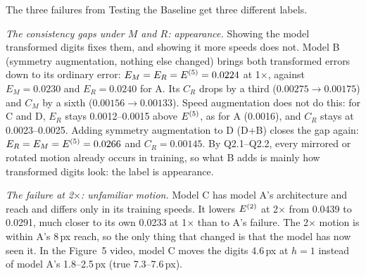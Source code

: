  The three failures from Testing the Baseline get three different labels.

\emph{The consistency gaps under $M$ and $R$: appearance.} Showing the model transformed digits fixes them,
and showing it more speeds does not. Model B (symmetry augmentation, nothing else changed) brings both
transformed errors down to its ordinary error: $E_M=E_R=E^{(5)}=0.0224$ at 1$\times$, against
$E_M=0.0230$ and $E_R=0.0240$ for A. Its $C_R$ drops by a third ($0.00275\to0.00175$) and $C_M$ by a sixth
($0.00156\to0.00133$). Speed augmentation does not do this: for C and D, $E_R$ stays 0.0012--0.0015 above $E^{(5)}$,
as for A (0.0016), and $C_R$ stays at 0.0023--0.0025. Adding symmetry augmentation to D (D+B) closes the gap
again: $E_R=E_M=E^{(5)}=0.0266$ and $C_R=0.00145$. By Q2.1--Q2.2, every mirrored or rotated motion already
occurs in training, so what B adds is mainly how transformed digits look: the label is appearance.

\emph{The failure at 2$\times$: unfamiliar motion.} Model C has model A's architecture and reach and
differs only in its training speeds. It lowers $E^{(2)}$ at 2$\times$ from 0.0439 to 0.0291, much closer to
its own 0.0233 at 1$\times$ than to A's failure. The 2$\times$ motion is within A's 8\,px reach, so
the only thing that changed is that the model has now seen it. In the Figure~5 video, model C moves the
digits 4.6\,px at $h=1$ instead of model A's 1.8--2.5\,px (true 7.3--7.6\,px).

